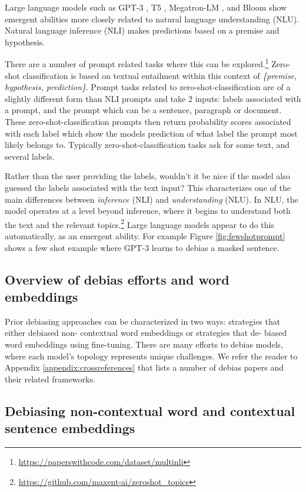 \documentclass[11pt]{article}
\begin{document}
Large language models such as GPT-3 \citep{brown2020language:20}, T5 \citep{raffel2020exploring:20}, Megatron-LM \citep{shoeybi2019megatron:19}, and Bloom \citep{scao2022bloom:22} show emergent abilities \citep{wei2022emergent:22} more closely related to natural language understanding (NLU). Natural language inference (NLI) makes predictions based on a premise and hypothesis. 

There are a number of prompt related tasks \citep{supernaturalinstructions:22} where this can be explored.\footnote{\url{https://paperswithcode.com/dataset/multinli}} Zero-shot classification is based on textual entailment within this context of \emph{\{premise, hypothesis, prediction\}}. Prompt tasks related to zero-shot-classification are of a slightly different form than NLI prompts and take 2 inputs: labels associated with a prompt, and the prompt which can be a sentence, paragraph or document. These zero-shot-classification prompts then return probability scores associated with each label which show the models prediction of what label the prompt most likely belongs to. Typically zero-shot-classification tasks ask for some text, and several labels. 

Rather than the user providing the labels, wouldn't it be nice if the model also guessed the labels associated with the text input? This characterizes one of the main differences between \emph{inference} (NLI) and \emph{understanding} (NLU). In NLU, the model operates at a level beyond inference, where it begins to understand both the text and the relevant topics.\footnote{\url{https://github.com/maxent-ai/zeroshot_topics}} Large language models appear to do this automatically, as an emergent ability. For example Figure \ref{fig:fewshotprompt} shows a few shot example where GPT-3 learns to debias a masked sentence. 

\subsection{Overview of debias efforts and word
embeddings}
Prior debiasing approaches can be characterized
in two ways: strategies that either debiased non-
contextual word embeddings or strategies that de-
biased word embeddings using fine-tuning.
There are many efforts to debias models, where each model's topology represents unique challenges. 
We refer the reader to Appendix \ref{appendix:crossreferences} that lists a number of debias papers and their related frameworks. 

\subsection{Debiasing non-contextual word and contextual sentence embeddings}
\end{document}
